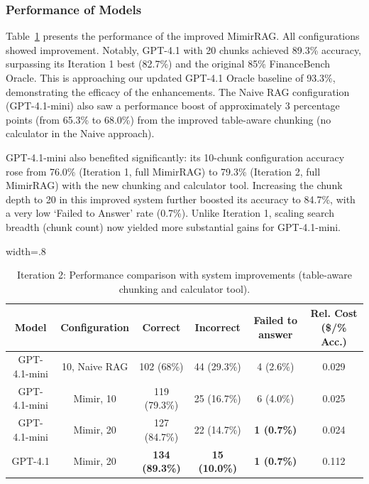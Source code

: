 \documentclass[final,5p,times,twopage,twocolumn,a4paper]{elsarticle}
\begin{document}
\subsubsection{Performance of Models}
\label{sec:iter2-results}
Table~\ref{tab:model-performance-iter2} presents the performance of the improved MimirRAG. All configurations showed improvement. Notably, GPT-4.1 with 20 chunks achieved 89.3\% accuracy, surpassing its Iteration 1 best (82.7\%) and the original 85\% FinanceBench Oracle. This is approaching our updated GPT-4.1 Oracle baseline of 93.3\%, demonstrating the efficacy of the enhancements. The Naive RAG configuration (GPT-4.1-mini) also saw a performance boost of approximately 3 percentage points (from 65.3\% to 68.0\%) from the improved table-aware chunking (no calculator in the Naive approach).

GPT-4.1-mini also benefited significantly: its 10-chunk configuration accuracy rose from 76.0\% (Iteration 1, full MimirRAG) to 79.3\% (Iteration 2, full MimirRAG) with the new chunking and calculator tool. Increasing the chunk depth to 20 in this improved system further boosted its accuracy to 84.7\%, with a very low `Failed to Answer' rate (0.7\%). Unlike Iteration 1, scaling search breadth (chunk count) now yielded more substantial gains for GPT-4.1-mini.

%
\begin{table}[!hbt]
\centering
\caption{Iteration 2: Performance comparison with system improvements (table-aware chunking and calculator tool).}
\label{tab:model-performance-iter2}
\begin{adjustbox}{width=.8\textwidth}
\begin{tabular}{|c|c|c|c|c|c|}
\hline
\textbf{Model} & \textbf{Configuration} & \textbf{Correct}      & \textbf{Incorrect}   & \textbf{Failed to answer} & \textbf{Rel. Cost (\$/\% Acc.)} \\ \hline
GPT-4.1-mini   & 10, Naive RAG          & 102 (68\%)            & 44 (29.3\%)          & 4 (2.6\%)                 & 0.029                           \\ \hline
GPT-4.1-mini   & Mimir, 10                     & 119 (79.3\%)          & 25 (16.7\%)          & 6 (4.0\%)                 & 0.025                           \\ \hline
GPT-4.1-mini   & Mimir, 20                     & 127 (84.7\%)          & 22 (14.7\%)          & \textbf{1 (0.7\%)}        & 0.024                           \\ \hline
GPT-4.1        & Mimir, 20                     & \textbf{134 (89.3\%)} & \textbf{15 (10.0\%)} & \textbf{1 (0.7\%)}        & 0.112                           \\ \hline
\end{tabular}
\end{adjustbox}
\end{table}
%
\end{document}
